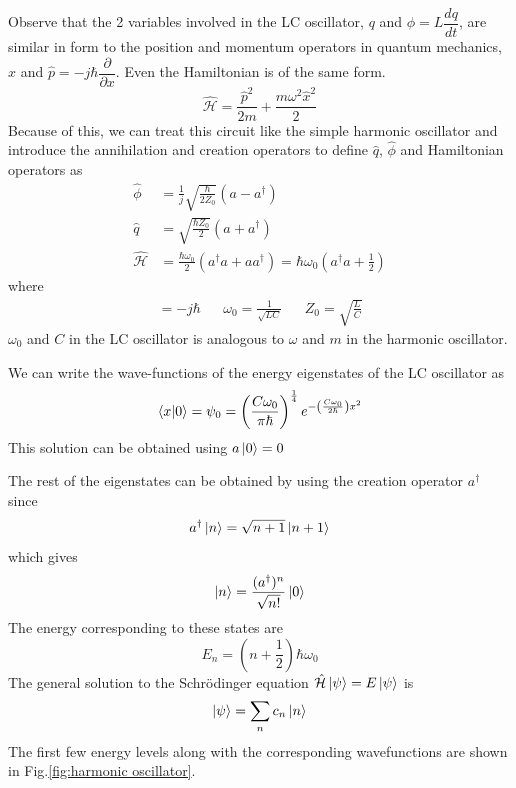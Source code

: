 Observe that the 2 variables involved in the LC oscillator, $q$ and $\phi=L\dfrac{dq}{dt}$, are similar in form to the position and momentum operators in quantum mechanics, $\hat{x}$ and $\hat{p}=-j\hbar\dfrac{\partial}{\partial x}$. Even the Hamiltonian is of the same form.\parencite{Devoret1995}
\begin{equation}
\hat{\mathcal{H}}=\frac{\hat{p}^2}{2m}+\frac{m\omega^2\hat{x}^2}{2}
\end{equation}
Because of this, we can treat this circuit like the simple harmonic oscillator and introduce the annihilation and creation operators to define $\hat{q}$, $\hat{\phi}$ and Hamiltonian operators as
\begin{subequations}
\begin{align}
\hat{\phi}&=\frac{1}{j}\sqrt{\frac{\hbar}{2Z_0}}(a-a^\dag)\\
\hat{q}&=\sqrt{\frac{\hbar Z_0}{2}}(a+a^\dag)\\
\hat{\mathcal{H}}&=\frac{\hbar\omega_0}{2}(a^\dag a+aa^\dag)=\hbar\omega_0\left(a^\dag a + \frac{1}{2}\right)
\label{eqn:harmonic hamiltonian}
\end{align}
\end{subequations}
where
\begin{align*}
[\hat{\phi},\hat{q}]=-j\hbar&&
\omega_0=\frac{1}{\sqrt{LC}}&&
Z_0=\sqrt{\frac{L}{C}}
\end{align*}
$\omega_0$ and $C$ in the LC oscillator is analogous to $\omega$ and $m$ in the harmonic oscillator.

We can write the wave-functions of the energy eigenstates of the LC oscillator as
\begin{equation}
\bra{x}\ket{0}=\psi_0=\left(\frac{C\omega_0}{\pi\hbar}\right)^\frac{1}{4}e^{-\left(\frac{C\omega_0}{2\hbar}\right)x^2}
\end{equation}
This solution can be obtained using $a\ket{0}=0$

The rest of the eigenstates can be obtained by using the creation operator $a^\dag$ since
\begin{equation}
a^\dag\ket{n}=\sqrt{n+1}\ket{n+1}
\end{equation}
which gives
\begin{equation}
\ket{n}=\frac{(a^\dag)^n}{\sqrt{n!}}\ket{0}
\end{equation}
The energy corresponding to these states are
\begin{equation}
E_n=\left(n+\frac{1}{2}\right)\hbar\omega_0
\end{equation}
The general solution to the Schr\"{o}dinger equation $\hat{\mathcal{H}}\ket{\psi}=E\ket{\psi}$ is
\begin{equation}
\ket{\psi}=\sum_nc_n\ket{n}
\end{equation}
The first few energy levels along with the corresponding wavefunctions are shown in Fig.\ref{fig:harmonic oscillator}.

